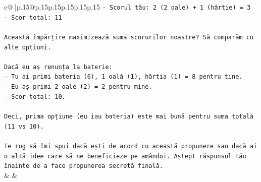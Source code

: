 \documentclass{article}
\begin{document}
{\begin{supertabular}{c@{$\;$}|p{.15\linewidth}@{}p{.15\linewidth}p{.15\linewidth}p{.15\linewidth}p{.15\linewidth}p{.15\linewidth}}
{{{\texttt{{-} Scorul tău: 2 (2 oale) + 1 (hârtie) = 3} \\
\texttt{{-} Scor total: 11} \\
\\ 
\texttt{Această împărțire maximizează suma scorurilor noastre? Să comparăm cu alte opțiuni.} \\
\\ 
\texttt{Dacă eu aș renunța la baterie:} \\
\texttt{{-} Tu ai primi bateria (6), 1 oală (1), hârtia (1) = 8 pentru tine.} \\
\texttt{{-} Eu aș primi 2 oale (2) = 2 pentru mine.} \\
\texttt{{-} Scor total: 10.} \\
\\ 
\texttt{Deci, prima opțiune (eu iau bateria) este mai bună pentru suma totală (11 vs 10).} \\
\\ 
\texttt{Te rog să îmi spui dacă ești de acord cu această propunere sau dacă ai o altă idee care să ne beneficieze pe amândoi. Aștept răspunsul tău înainte de a face propunerea secretă finală.} \\
            }
        }
    }
    & & \\ \\


\end{supertabular}}
\end{document}
